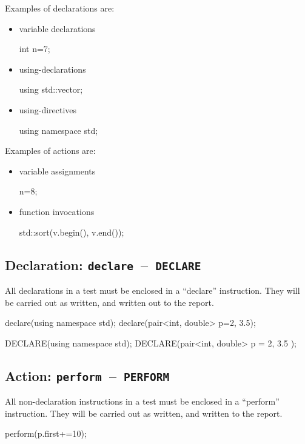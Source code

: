 \documentclass[twoside, a4paper, article]{memoir}
\newcommand*\testudocolor{\color{red!80!blue}}
\newcommand*\testudo[1]{\texttt{\testudocolor{}#1}}
\newcommand*\testudopair[2]{\testudo{#1}~--~\testudo{#2}}
\newcommand\subsectiontestudopair[3]{%
  \subsection[#1]{#1: \testudopair{#2}{#3}}}
\begin{document}
Examples of declarations are:
\begin{itemize}
\item variable declarations
\begin{cpplisting}
int n=7;
\end{cpplisting}

\item using-declarations
\begin{cpplisting}
using std::vector;
\end{cpplisting}

\item using-directives
\begin{cpplisting}
using namespace std;
\end{cpplisting}
\end{itemize}

Examples of actions are:
\begin{itemize}
\item variable assignments
\begin{cpplisting}
n=8;
\end{cpplisting}

\item function invocations
\begin{cpplisting}
std::sort(v.begin(), v.end());
\end{cpplisting}
\end{itemize}

\subsectiontestudopair{Declaration}{declare}{DECLARE}
\label{sec:declaration}

All declarations in a test must be enclosed in a ``declare'' instruction.  They
will be carried out as written, and written out to the report.
\begin{cpplisting}
declare(using namespace std);
declare(pair<int, double> p={2, 3.5});
\end{cpplisting}

\begin{cpplisting}
DECLARE(using namespace std);
DECLARE(pair<int, double> p = { 2, 3.5 });
\end{cpplisting}

\subsectiontestudopair{Action}{perform}{PERFORM}
\label{sec:action}

All non-declaration instructions in a test must be enclosed in a ``perform''
instruction.  They will be carried out as written, and written to the report.
\begin{cpplisting}
perform(p.first+=10);
\end{cpplisting}
\end{document}
